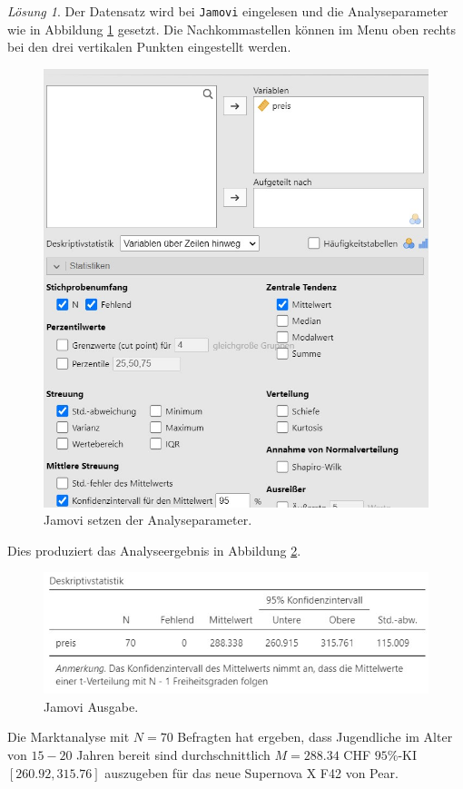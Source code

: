 \documentclass[
]{book}
\theoremstyle{definition}
\theoremstyle{definition}
\theoremstyle{definition}
\theoremstyle{definition}
\theoremstyle{remark}
\newtheorem*{solution}{Lösung}
\begin{document}
\begin{solution}
Der Datensatz wird bei \texttt{Jamovi} eingelesen und die Analyseparameter wie in Abbildung \ref{fig:sol-marktpreisanalyse-input} gesetzt. Die Nachkommastellen können im Menu oben rechts bei den drei vertikalen Punkten eingestellt werden.

\begin{figure}
\includegraphics[width=1\linewidth]{figures/04-exr-marktpreisanalyse-jmv-input} \caption{Jamovi setzen der Analyseparameter.}\label{fig:sol-marktpreisanalyse-input}
\end{figure}

Dies produziert das Analyseergebnis in Abbildung \ref{fig:sol-marktpreisanalyse-output}.

\begin{figure}
\includegraphics[width=1\linewidth]{figures/04-exr-marktpreisanalyse-jmv-output} \caption{Jamovi Ausgabe.}\label{fig:sol-marktpreisanalyse-output}
\end{figure}

Die Marktanalyse mit \(N = 70\) Befragten hat ergeben, dass Jugendliche im Alter von \(15-20\) Jahren bereit sind durchschnittlich \(M = 288.34\) CHF \(95\%\)-KI \([260.92,315.76]\) auszugeben für das neue Supernova X F42 von Pear.
\end{solution}
\end{document}
